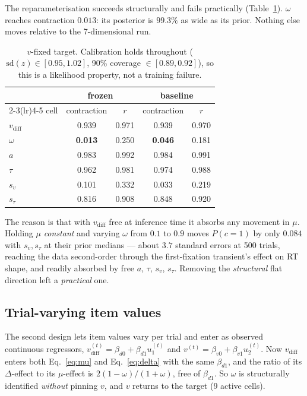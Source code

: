\documentclass[11pt]{article}
\newcommand{\vdiff}{v_{\mathrm{diff}}}
\newcommand{\Dch}{\Delta}
\begin{document}
The reparameterisation succeeds structurally and fails practically
(Table~\ref{tab:vfixed}). $\omega$ reaches contraction $0.013$: its posterior is
$99.3\%$ as wide as its prior. Nothing else moves relative to the 7-dimensional run.

\begin{table}[h]
\centering
\begin{tabular}{l cc cc}
\toprule
& \multicolumn{2}{c}{frozen} & \multicolumn{2}{c}{baseline} \\
\cmidrule(lr){2-3}\cmidrule(lr){4-5}
cell & contraction & $r$ & contraction & $r$ \\
\midrule
$\vdiff$   & 0.939 & 0.971 & 0.939 & 0.970 \\
$\omega$   & \textbf{0.013} & 0.250 & \textbf{0.046} & 0.181 \\
$a$        & 0.983 & 0.992 & 0.984 & 0.991 \\
$\tau$     & 0.962 & 0.981 & 0.974 & 0.988 \\
$s_v$      & 0.101 & 0.332 & 0.033 & 0.219 \\
$s_\tau$   & 0.816 & 0.908 & 0.848 & 0.920 \\
\bottomrule
\end{tabular}
\caption{$v$-fixed target. Calibration holds throughout
($\mathrm{sd}(z)\in[0.95,1.02]$, 90\% coverage $\in[0.89,0.92]$), so this is a
likelihood property, not a training failure.}
\label{tab:vfixed}
\end{table}

The reason is that with $\vdiff$ free at inference time it absorbs any movement in
$\mu$. Holding $\mu$ \emph{constant} and varying $\omega$ from $0.1$ to $0.9$ moves
$P(c{=}1)$ by only $0.084$ with $s_v,s_\tau$ at their prior medians --- about
$3.7$ standard errors at 500 trials, reaching the data second-order through the
first-fixation transient's effect on RT shape, and readily absorbed by free
$a$, $\tau$, $s_v$, $s_\tau$. Removing the \emph{structural} flat direction left a
\emph{practical} one.

\subsection{Trial-varying item values}

The second design lets item values vary per trial and enter as observed continuous
regressors, $\vdiff^{(t)} = \beta_{d0} + \beta_{d1} u_1^{(t)}$ and
$v^{(t)} = \beta_{v0} + \beta_{v1} u_2^{(t)}$. Now $\vdiff$ enters both
Eq.~\eqref{eq:mu} and Eq.~\eqref{eq:delta} with the same $\beta_{d1}$, and the ratio of
its $\Dch$-effect to its $\mu$-effect is $2(1-\omega)/(1+\omega)$, free of
$\beta_{d1}$. So $\omega$ is structurally identified \emph{without} pinning $v$, and
$v$ returns to the target (9 active cells).
\end{document}
